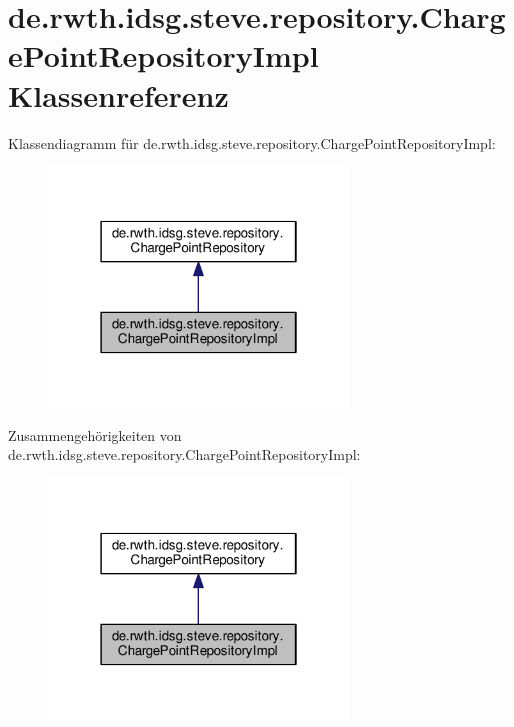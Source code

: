 \hypertarget{classde_1_1rwth_1_1idsg_1_1steve_1_1repository_1_1_charge_point_repository_impl}{\section{de.\-rwth.\-idsg.\-steve.\-repository.\-Charge\-Point\-Repository\-Impl Klassenreferenz}
\label{classde_1_1rwth_1_1idsg_1_1steve_1_1repository_1_1_charge_point_repository_impl}
}


Klassendiagramm für de.\-rwth.\-idsg.\-steve.\-repository.\-Charge\-Point\-Repository\-Impl\-:
\nopagebreak
\begin{figure}[H]
\begin{center}
\leavevmode
\includegraphics[width=226pt]{classde_1_1rwth_1_1idsg_1_1steve_1_1repository_1_1_charge_point_repository_impl__inherit__graph}
\end{center}
\end{figure}


Zusammengehörigkeiten von de.\-rwth.\-idsg.\-steve.\-repository.\-Charge\-Point\-Repository\-Impl\-:
\nopagebreak
\begin{figure}[H]
\begin{center}
\leavevmode
\includegraphics[width=226pt]{classde_1_1rwth_1_1idsg_1_1steve_1_1repository_1_1_charge_point_repository_impl__coll__graph}
\end{center}
\end{figure}
